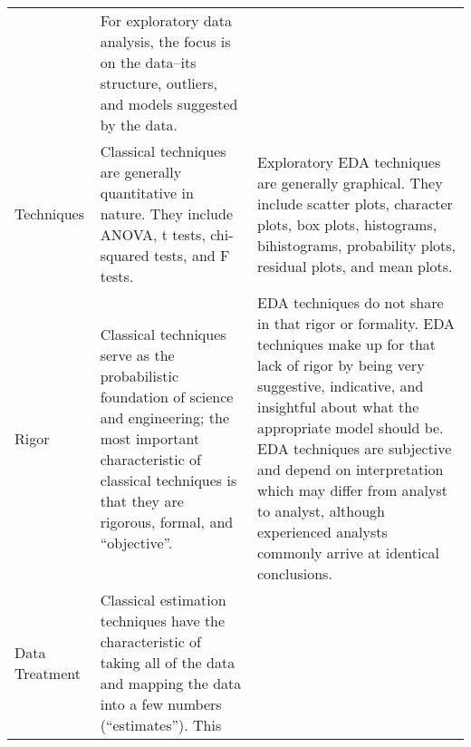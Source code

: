 \documentclass[]{book}
\theoremstyle{definition}
\theoremstyle{definition}
\theoremstyle{definition}
\theoremstyle{remark}
\begin{document}
\begin{longtable}[]{@{}lll@{}}
\begin{minipage}[t]{0.39\columnwidth}
\end{minipage} & \begin{minipage}[t]{0.39\columnwidth}\raggedright\strut
For exploratory data analysis, the focus is on the data--its structure,
outliers, and models suggested by the data.\strut
\end{minipage}\tabularnewline
\begin{minipage}[t]{0.14\columnwidth}\raggedright\strut
Techniques\strut
\end{minipage} & \begin{minipage}[t]{0.39\columnwidth}\raggedright\strut
Classical techniques are generally quantitative in nature. They include
ANOVA, t tests, chi-squared tests, and F tests.\strut
\end{minipage} & \begin{minipage}[t]{0.39\columnwidth}\raggedright\strut
Exploratory EDA techniques are generally graphical. They include scatter
plots, character plots, box plots, histograms, bihistograms, probability
plots, residual plots, and mean plots.\strut
\end{minipage}\tabularnewline
\begin{minipage}[t]{0.14\columnwidth}\raggedright\strut
Rigor\strut
\end{minipage} & \begin{minipage}[t]{0.39\columnwidth}\raggedright\strut
Classical techniques serve as the probabilistic foundation of science
and engineering; the most important characteristic of classical
techniques is that they are rigorous, formal, and ``objective''.\strut
\end{minipage} & \begin{minipage}[t]{0.39\columnwidth}\raggedright\strut
EDA techniques do not share in that rigor or formality. EDA techniques
make up for that lack of rigor by being very suggestive, indicative, and
insightful about what the appropriate model should be. EDA techniques
are subjective and depend on interpretation which may differ from
analyst to analyst, although experienced analysts commonly arrive at
identical conclusions.\strut
\end{minipage}\tabularnewline
\begin{minipage}[t]{0.14\columnwidth}\raggedright\strut
Data Treatment\strut
\end{minipage} & \begin{minipage}[t]{0.39\columnwidth}\raggedright\strut
Classical estimation techniques have the characteristic of taking all of
the data and mapping the data into a few numbers (``estimates''). This

\end{minipage}
\end{longtable}
\end{document}
